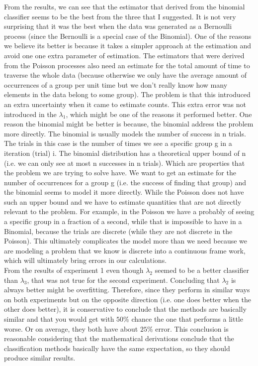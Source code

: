 \documentclass[a4paper]{article}
\begin{document}
From the results, we can see that the estimator that derived from the binomial classifier seems to be the best from the three that I suggested.
It is not very surprising that it was the best when the data was generated as a Bernoulli process (since the Bernoulli is a special case of the Binomial).
One of the reasons we believe its better is because it takes a simpler approach at the estimation and avoid one one extra parameter of estimation.
The estimators that were derived from the Poisson processes also need an estimate for the total amount of time to traverse the whole data (because otherwise we only have the average amount of occurrences of a group per unit time but we don't really know how many elements in the data belong to some group).
The problem is that this introduced an extra uncertainty when it came to estimate counts. 
This extra error was not introduced in the $\lambda_1$, which might be one of the reasons it performed better.
One reason the binomial might be better is because, the binomial address the problem more directly.
The binomial is usually models the number of success in n trials.
The trials in this case is the number of times we see a specific group g in a iteration (trial) i.
The binomial distribution has a theoretical upper bound of n (i.e. we can only see at most n successes in n trials).
Which are properties that the problem we are trying to solve have.
We want to get an estimate for the number of occurrences for a group g (i.e. the success of finding that group) and the binomial seems to model it more directly.
While the Poisson does not have such an upper bound and we have to estimate quantities that are not directly relevant to the problem.
For example, in the Poisson we have a probably of seeing a specific group in a fraction of a second, while that is impossible to have in a Binomial, because the trials are discrete (while they are not discrete in the Poisson).
This ultimately complicates the model more than we need because we are modeling a problem that we know is discrete into a continuous frame work, which will ultimately bring errors in our calculations. \\
From the results of experiment 1 even though $\lambda_2$ seemed to be a better classifier than $\lambda_3$,  that was not true for the second experiment. 
Concluding that $\lambda_2$ is always better might be overfitting.
Therefore, since they perform in similar ways on both experiments but on the opposite direction (i.e. one does better when the other does better), it is conservative to conclude that the methods are basically similar and that you would get with $50\%$ chance the one that performs a little worse. 
Or on average, they both have about $25\%$ error.
This conclusion is reasonable considering that the mathematical derivations conclude that the classification methods basically have the same expectation, so they should produce similar results.
\end{document}
